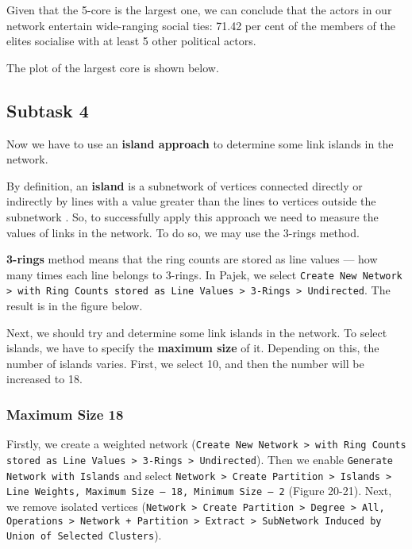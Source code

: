 Given that the 5-core is the largest one, we can conclude that the actors in our network entertain wide-ranging social ties: 71.42 per cent of the members of the elites socialise with at least 5 other political actors. 

The plot of the largest core is shown below.

\FloatBarrier
\clearpage



\subsection{Subtask 4}
Now we have to use an \textbf{island approach} to determine some link islands in the network.

By definition, an \textbf{island} is a subnetwork of vertices connected directly or indirectly by lines with a value greater than the lines to vertices outside the subnetwork \cite{de_nooy_2018}. So, to successfully apply this approach we need to measure the values of links in the network. To do so, we may use the 3-rings method. 

\textbf{3-rings} method means that the ring counts are stored as line values — how many times each line belongs to 3-rings. In Pajek, we select \texttt{Create New Network > with Ring Counts stored as Line Values > 3-Rings > Undirected}. The result is in the figure below.


Next, we should try and determine some link islands in the network. To select islands, we have to specify the \textbf{maximum size} of it. Depending on this, the number of islands varies. First, we select 10, and then the number will be increased to 18.

\subsubsection{Maximum Size 18}
Firstly, we create a weighted network (\texttt{Create New Network > with Ring Counts stored as Line Values > 3-Rings > Undirected}). Then we enable \texttt{Generate Network with Islands} and select \texttt{Network > Create Partition > Islands > Line Weights, Maximum Size — 18, Minimum Size — 2} (Figure 20-21). Next, we remove isolated vertices (\texttt{Network > Create Partition > Degree > All, Operations > Network + Partition > Extract > SubNetwork Induced by Union of Selected Clusters}).


